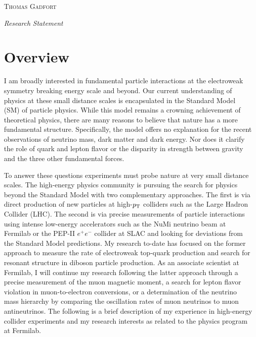 \documentclass[12pt]{article}
\newcommand{\hr}{\centerline{\hskip 30mm\hrulefill\hskip 30mm}}
\begin{document}
\begin{center}
{\LARGE \textsc{Thomas Gadfort}}
\smallskip

\emph{Research Statement}
\end{center}

\vspace{-11pt}
\hr

\bigskip

\section{Overview}

I am broadly interested in fundamental particle interactions at the electroweak symmetry breaking energy scale and beyond. Our current understanding of physics at these small distance scales is encapsulated in the Standard Model (SM) of particle physics. While this model remains a crowning achievement of theoretical physics, there are many reasons to believe that nature has a more fundamental structure. Specifically, the model offers no explanation for the recent observations of neutrino mass, dark matter and dark energy. Nor does it clarify the role of quark and lepton flavor or the disparity in strength between gravity and the three other fundamental forces.

To answer these questions experiments must probe nature at very small distance scales. The high-energy physics community is pursuing the search for physics beyond the Standard Model with two complementary approaches.  The first is via direct production of new particles at high-$p_{\rm{T}}$ colliders such as the Large Hadron Collider (LHC).  The second is via precise measurements of particle interactions using intense low-energy accelerators such as the NuMi neutrino beam at Fermilab or the PEP-II $e^+e^-$ collider at SLAC and looking for deviations from the Standard Model predictions. My research to-date has focused on the former approach to measure the rate of electroweak top-quark production and search for resonant structure in diboson particle production. As an associate scientist at Fermilab, I will continue my research following the latter approach through a precise measurement of the muon magnetic moment, a search for lepton flavor violation in muon-to-electron conversions, or a determination of the neutrino mass hierarchy by comparing the oscillation rates of muon neutrinos to muon antineutrinos. The following is a brief description of my experience in high-energy collider experiments and my research interests as related to the physics program at Fermilab.
\end{document}
